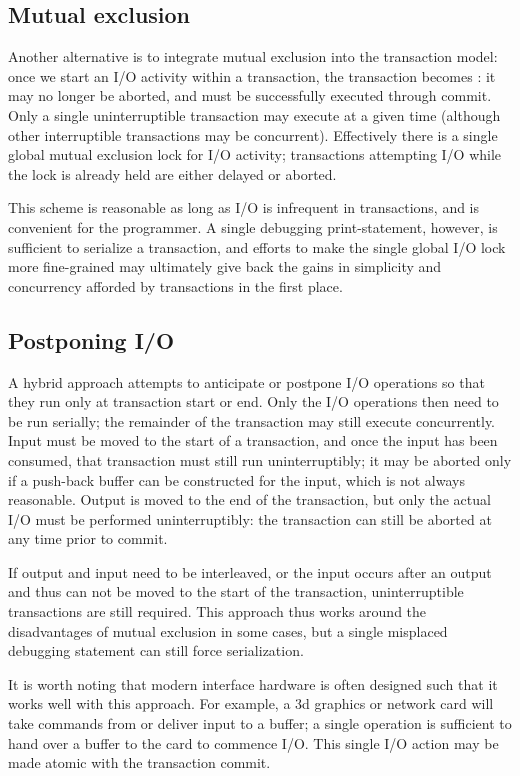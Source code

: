 \subsection{Mutual exclusion}
Another alternative is to integrate mutual exclusion into the
transaction model: once we start an I/O activity within a transaction,
the transaction becomes : it may no longer be
aborted, and must be successfully executed through commit.
Only a single uninterruptible transaction may execute at a given time
(although other interruptible transactions may be concurrent).
Effectively there is a single global mutual exclusion lock for I/O
activity; transactions attempting I/O while the lock is already held
are either delayed or aborted.

This scheme is reasonable as long as I/O is infrequent in
transactions, and is convenient for the programmer.
A single debugging print-statement, however, is sufficient to
serialize a transaction, and efforts to make the single global I/O
lock more fine-grained may ultimately give back the gains in
simplicity and concurrency afforded by transactions in the first place.

\subsection{Postponing I/O}
A hybrid approach attempts to anticipate or postpone I/O operations so
that they run only at transaction start or end.
Only the I/O operations then need to be run serially; the remainder of
the transaction may still execute concurrently.  Input must be moved
to the start of a transaction, and once the input has been consumed,
that transaction must still run uninterruptibly; it may be aborted
only if a push-back buffer can be constructed for the input, which is
not always reasonable.  Output is moved to the end of the transaction,
but only the actual I/O must be performed uninterruptibly: the
transaction can still be aborted at any time prior to commit.

If output and input need to be interleaved, or the input occurs after
an output and thus can not be moved to the start of the transaction,
uninterruptible transactions are still required.  This approach thus
works around the disadvantages of mutual exclusion in some cases, but
a single misplaced debugging statement can still force serialization.

It is worth noting that modern interface hardware is often designed
such that it works well with this approach.  For example, a 3d
graphics or network card will take commands from or deliver input to a
buffer; a single operation is sufficient to hand over a buffer to
the card to commence I/O.  This single I/O action may be made atomic
with the transaction commit.

